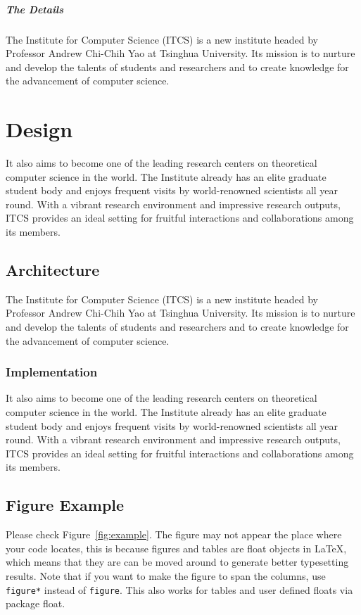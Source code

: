 \documentclass{ics}
\begin{document}
\subparagraph{The Details}
\label{sec:details-1}
The Institute for Computer Science (ITCS) is a new institute headed by Professor
Andrew Chi-Chih Yao at Tsinghua University. Its mission is to nurture and
develop the talents of students and researchers and to create knowledge for the
advancement of computer science. 

\section{Design}
\label{sec:design}
It also aims to become one of the leading research centers on theoretical
computer science in the world. The Institute already has an elite graduate
student body and enjoys frequent visits by world-renowned scientists all year
round. With a vibrant research environment and impressive research outputs, ITCS
provides an ideal setting for fruitful interactions and collaborations among its
members.

\subsection{Architecture}
\label{sec:architecture}
The Institute for Computer Science (ITCS) is a new institute headed by Professor
Andrew Chi-Chih Yao at Tsinghua University. Its mission is to nurture and
develop the talents of students and researchers and to create knowledge for the
advancement of computer science.

\subsubsection{Implementation}
\label{sec:implementation}
It also aims to become one of the leading research centers on theoretical
computer science in the world. The Institute already has an elite graduate
student body and enjoys frequent visits by world-renowned scientists all year
round. With a vibrant research environment and impressive research outputs, ITCS
provides an ideal setting for fruitful interactions and collaborations among its
members.

\subsection{Figure Example}
\label{sec:ref-figure}
Please check Figure~\ref{fig:example}. The figure may not appear the place where
your code locates, this is because figures and tables are float objects in
\LaTeX, which means that they are can be moved around to generate better
typesetting results. Note that if you want to make the figure to span the
columns, use \texttt{figure*} instead of \texttt{figure}. This also works for
tables and user defined floats via package \textsf{float}.
\end{document}
